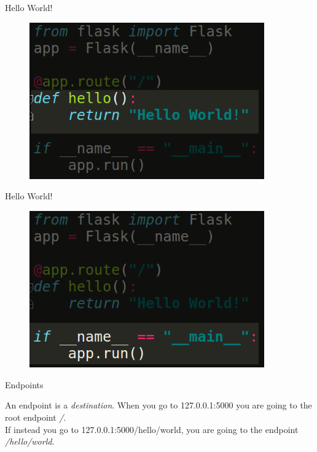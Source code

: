 \documentclass{beamer}
\begin{document}
\begin{frame}{Hello World!}

\begin{figure}[h]
\includegraphics[width=0.9\textwidth]{flask3}
\end{figure}

\end{frame}
\begin{frame}{Hello World!}

\begin{figure}[h]
\includegraphics[width=0.9\textwidth]{flask4}
\end{figure}

\end{frame}

\begin{frame}{Endpoints}

An endpoint is a \textit{destination}. When you go to 127.0.0.1:5000 you are going to the root endpoint \textit{/}.\pause \\
If instead you go to 127.0.0.1:5000/hello/world, you are going to the endpoint \textit{/hello/world}.

\end{frame}
\end{document}
